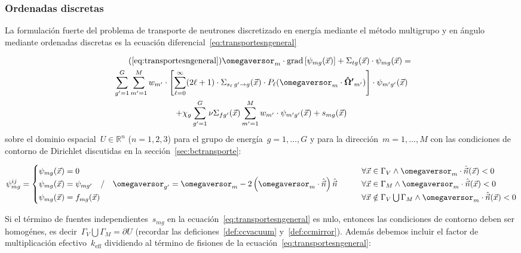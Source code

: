 \subsubsection{Ordenadas discretas} %

La formulación fuerte del problema de transporte de neutrones discretizado en energía mediante el método multigrupo y en ángulo mediante ordenadas discretas es la ecuación diferencial~\eqref{eq:transportesngeneral}

\begin{multline}\tag{\ref{eq:transportesngeneral}}
 \omegaversor_m \cdot \text{grad} \left[ \psi_{mg}(\vec{x}) \right]
 + \Sigma_{t g}(\vec{x}) \cdot \psi_{mg}(\vec{x}) = \\
  \sum_{g^\prime=1}^G \sum_{m^\prime=1}^M w_{m^\prime} \cdot
\left[  \sum_{\ell=0}^\infty (2\ell+1) \cdot \Sigma_{s_\ell \,g^\prime \rightarrow g}(\vec{x}) \cdot P_\ell (\omegaversor_m \cdot \boldsymbol{\hat{\Omega}^\prime}_{m^\prime}) \right]
 \cdot \psi_{m^\prime g^\prime}(\vec{x}) \\
+ \chi_g \sum_{g^\prime=1}^G \nu\Sigma_{fg^\prime}(\vec{x}) \sum_{m^\prime=1}^M w_{m^\prime} \cdot \psi_{m^\prime g^\prime}(\vec{x})
+ s_{mg}(\vec{x})
\end{multline}
%
sobre el dominio espacial~$U \in \mathbb{R}^n$ ($n=1,2,3$) para el grupo de energía~$g=1,\dots,G$ y para la dirección~$m=1,\dots,M$ con las condiciones de contorno de Dirichlet discutidas en la sección~\ref{sec:bctransporte}:

\begin{equation}\label{eq:transportesncc}
\psi_{mg}^{ij} =
 \begin{cases}
  \psi_{mg}(\vec{x}) = 0 
&\quad\quad \forall \vec{x} \in \Gamma_V \wedge \omegaversor_m \cdot \hat{\vec{n}}(\vec{x}) < 0 \\
  \psi_{mg}(\vec{x}) = \psi_{mg^\prime} \quad / \quad \omegaversor_{g^\prime} = \omegaversor_m - 2 \left( \omegaversor_m \cdot \hat{\vec{n}} \right) \hat{\vec{n}}
&\quad\quad \forall \vec{x} \in \Gamma_M \wedge \omegaversor_m \cdot \hat{\vec{n}}(\vec{x}) < 0 \\
  \psi_{mg}(\vec{x}) = f_{mg}(\vec{x})
&\quad\quad \forall \vec{x} \notin \Gamma_V \bigcup \Gamma_M \wedge \omegaversor_m \cdot \hat{\vec{n}}(\vec{x}) < 0 \\
 \end{cases}
\end{equation}

Si el término de fuentes independientes~$s_{mg}$ en la ecuación~\eqref{eq:transportesngeneral} es nulo, entonces las condiciones de contorno deben ser homogénes, es decir~$\Gamma_V \bigcup \Gamma_M = \partial U$ (recordar las deficiones~\ref{def:ccvacuum} y~\ref{def:ccmirror}). Además debemos incluir el factor de multiplicación efectivo~$k_\text{eff}$ dividiendo al término de fisiones de la ecuación~\eqref{eq:transportesngeneral}:


